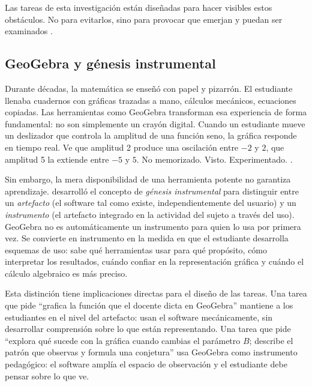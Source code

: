 Las tareas de esta investigación están diseñadas para hacer visibles estos obstáculos. No para evitarlos, sino para provocar que emerjan y puedan ser examinados \parencite{leungDesigningMathematicsTasks2015}.

\subsection{GeoGebra y génesis instrumental}

Durante décadas, la matemática se enseñó con papel y pizarrón. El estudiante llenaba cuadernos con gráficas trazadas a mano, cálculos mecánicos, ecuaciones copiadas. Las herramientas como GeoGebra transforman esa experiencia de forma fundamental: no son simplemente un crayón digital. Cuando un estudiante mueve un deslizador que controla la amplitud de una función seno, la gráfica responde en tiempo real. Ve que amplitud 2 produce una oscilación entre $-2$ y $2$, que amplitud 5 la extiende entre $-5$ y $5$. No memorizado. Visto. Experimentado. \parencite{hohenwartherCombinationDynamicGeometry2004, zenginEffectDynamicMathematics2012}.

Sin embargo, la mera disponibilidad de una herramienta potente no garantiza aprendizaje. \textcite{troucheManagingComplexityHuman2004} desarrolló el concepto de \emph{génesis instrumental} para distinguir entre un \emph{artefacto} (el software tal como existe, independientemente del usuario) y un \emph{instrumento} (el artefacto integrado en la actividad del sujeto a través del uso). GeoGebra no es automáticamente un instrumento para quien lo usa por primera vez. Se convierte en instrumento en la medida en que el estudiante desarrolla esquemas de uso: sabe qué herramientas usar para qué propósito, cómo interpretar los resultados, cuándo confiar en la representación gráfica y cuándo el cálculo algebraico es más preciso.

Esta distinción tiene implicaciones directas para el diseño de las tareas. Una tarea que pide ``grafica la función que el docente dicta en GeoGebra'' mantiene a los estudiantes en el nivel del artefacto: usan el software mecánicamente, sin desarrollar comprensión sobre lo que están representando. Una tarea que pide ``explora qué sucede con la gráfica cuando cambias el parámetro $B$; describe el patrón que observas y formula una conjetura'' usa GeoGebra como instrumento pedagógico: el software amplía el espacio de observación y el estudiante debe pensar sobre lo que ve.

